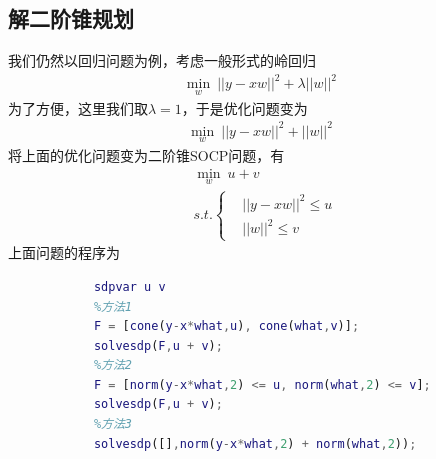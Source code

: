         \subsection{解二阶锥规划}
            \par
            我们仍然以回归问题为例，考虑一般形式的岭回归
            \begin{align*}
            \min_w \ ||y - xw||^2 + \lambda||w||^2
            \end{align*}
            为了方便，这里我们取$\lambda = 1$，于是优化问题变为
            \begin{align*}
            \min_w \ ||y - xw||^2 + ||w||^2
            \end{align*}
            将上面的优化问题变为二阶锥SOCP问题，有
            \begin{align*}
            &\min_w  \ u+v\\
            &s.t.\left\{
            \begin{aligned}
            &||y-xw||^2 \leqslant u\\
            &||w||^2 \leqslant v
            \end{aligned}
            \right.
            \end{align*}
            上面问题的程序为
            \begin{lstlisting}[language = Matlab]
            %% 二阶锥规划--线性回归示例
            sdpvar u v
            %方法1
            F = [cone(y-x*what,u), cone(what,v)];
            solvesdp(F,u + v);
            %方法2
            F = [norm(y-x*what,2) <= u, norm(what,2) <= v];
            solvesdp(F,u + v);
            %方法3
            solvesdp([],norm(y-x*what,2) + norm(what,2));
            \end{lstlisting}
